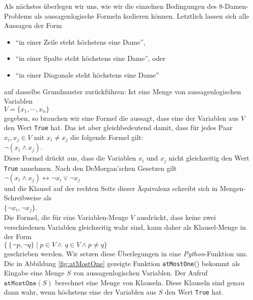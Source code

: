 Als nächstes überlegen wir uns, wie wir die einzelnen Bedingungen des 8-Damen-Problems 
als aussagenlogische
Formeln kodieren können.  Letztlich lassen sich alle Aussagen der Form
\begin{itemize}
\item ``in einer Zeile steht höchstens eine Dame'', 
\item ``in einer Spalte steht höchstens eine Dame'', oder 
\item ``in einer Diagonale steht höchstens eine Dame'' 
\end{itemize}
auf dasselbe Grundmuster zurückführen:
Ist eine Menge von aussagenlogischen Variablen \\[0.2cm]
\hspace*{1.3cm} $V = \{ x_1, \cdots, x_n \}$ \\[0.2cm]
gegeben, so brauchen wir eine Formel die aussagt, dass  eine der Variablen aus
$V$ den Wert \texttt{True} hat.  Das ist aber gleichbedeutend damit, dass für jedes Paar
$x_i, x_j \in V$ mit $x_i \not= x_j$ die folgende Formel gilt: \\[0.2cm]
\hspace*{1.3cm} $\neg (x_i \wedge x_j)$. \\[0.2cm]
Diese Formel drückt aus, dass die Variablen $x_i$ und $x_j$ nicht gleichzeitig den Wert
\texttt{True} annehmen.  Nach den De\-Morgan'schen Gesetzen gilt
\\[0.2cm]
\hspace*{1.3cm}
$\neg (x_i \wedge x_j) \leftrightarrow \neg x_i \vee \neg x_j$
\\[0.2cm]
und die Klausel auf der rechten Seite dieser Äquivalenz schreibt sich in Mengen-Schreibweise als
\\[0.2cm]
\hspace*{1.3cm}  $\{\neg x_i, \neg x_j \}$. \\[0.2cm]
Die Formel, die für eine Variablen-Menge $V$ ausdrückt, dass keine zwei verschiedenen
Variablen gleichzeitig wahr sind, kann daher als Klausel-Menge in der Form
\\[0.2cm]
\hspace*{1.3cm}
$\bigl\{\, \{ \neg p, \neg q \} \;|\; p \in V \wedge\ q \in V \wedge p \not= q \bigr\}$
\\[0.2cm]
geschrieben werden.
Wir setzen diese Überlegungen in eine \textsl{Python}-Funktion um.  Die in Abbildung \ref{fig:atMostOne}
gezeigte Funktion \texttt{atMostOne}() bekommt als Eingabe eine Menge $S$ von
aussagenlogischen Variablen.  Der Aufruf $\texttt{atMostOne}(S)$ berechnet eine Menge von
Klauseln.  Diese Klauseln sind genau dann wahr, wenn höchstens eine der Variablen aus $S$
den Wert \texttt{True} hat.

